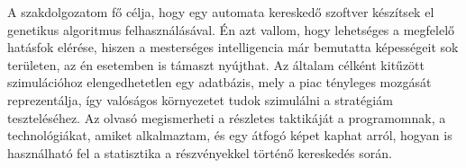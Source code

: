 A szakdolgozatom fő célja, hogy egy automata kereskedő szoftver készítsek el genetikus algoritmus felhasználásával. Én azt vallom, hogy lehetséges a megfelelő hatásfok elérése, hiszen a mesterséges intelligencia már bemutatta képességeit sok területen, az én esetemben is támaszt nyújthat. Az általam célként kitűzött szimulációhoz elengedhetetlen egy adatbázis, mely a piac tényleges mozgását reprezentálja, így valóságos környezetet tudok szimulálni a stratégiám teszteléséhez. Az olvasó megismerheti a részletes taktikáját a programomnak, a technológiákat, amiket alkalmaztam, és egy átfogó képet kaphat arról, hogyan is használható fel a statisztika a részvényekkel történő kereskedés során. 